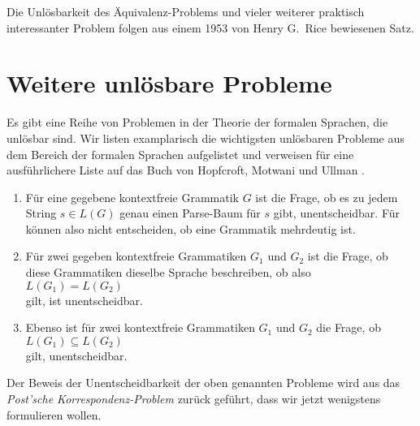 \noindent
Die Unl\"osbarkeit des \"Aquivalenz-Problems und vieler weiterer praktisch interessanter
Problem folgen aus einem 1953 von Henry G.~Rice \cite{rice:53} bewiesenen Satz.

\section{Weitere unl\"osbare Probleme}
Es gibt eine Reihe von Problemen in der Theorie der formalen Sprachen, die unl\"osbar sind.
Wir listen examplarisch die wichtigsten unl\"osbaren Probleme aus dem Bereich der formalen
Sprachen aufgelistet und verweisen f\"ur eine ausf\"uhrlichere Liste auf das Buch von
Hopfcroft, Motwani und Ullman \cite{hopcroft:06}.
\begin{enumerate}
\item F\"ur eine gegebene kontextfreie Grammatik $G$ ist die Frage, ob es zu jedem
      String $s \in L(G)$ genau einen Parse-Baum f\"ur $s$ gibt, unentscheidbar.  F\"ur k\"onnen
      also nicht entscheiden, ob eine Grammatik mehrdeutig ist.
\item F\"ur zwei gegeben kontextfreie Grammatiken $G_1$ und $G_2$ ist die Frage, ob
      diese Grammatiken dieselbe Sprache beschreiben, ob also
      \\[0.2cm]
      \hspace*{1.3cm}
      $L(G_1) = L(G_2)$
      \\[0.2cm]
      gilt, ist unentscheidbar.
\item Ebenso ist f\"ur zwei kontextfreie Grammatiken $G_1$ und $G_2$ die Frage,
      ob 
      \\[0.2cm]
      \hspace*{1.3cm}
      $L(G_1) \subseteq L(G_2)$
      \\[0.2cm]
      gilt, unentscheidbar.
\end{enumerate}
Der Beweis der Unentscheidbarkeit der oben genannten Probleme wird aus das
\emph{Post'sche Korrespondenz-Problem} zur\"uck gef\"uhrt, dass wir jetzt wenigstens
formulieren wollen.

